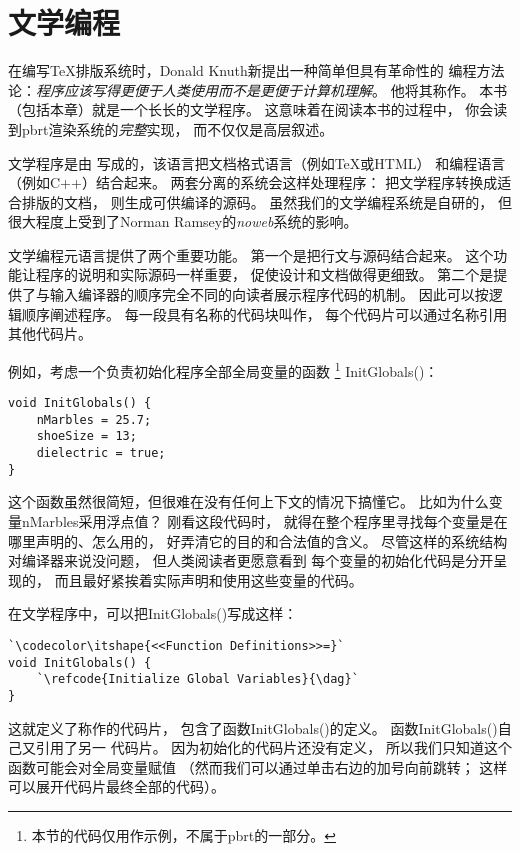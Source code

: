 \section{文学编程}\label{sec:文学编程}

在编写\TeX 排版系统时，Donald Knuth新提出一种简单但具有革命性的
编程方法论：\emph{程序应该写得更便于人类使用而不是更便于计算机理解}。
他将其称作。
本书（包括本章）就是一个长长的文学程序。
这意味着在阅读本书的过程中，
你会读到pbrt渲染系统的\emph{完整}实现，
而不仅仅是高层叙述。

文学程序是由
写成的，该语言把文档格式语言（例如\TeX 或HTML）
和编程语言（例如C++）结合起来。
两套分离的系统会这样处理程序：
把文学程序转换成适合排版的文档，
则生成可供编译的源码。
虽然我们的文学编程系统是自研的，
但很大程度上受到了Norman Ramsey的\emph{noweb}系统的影响。

文学编程元语言提供了两个重要功能。
第一个是把行文与源码结合起来。
这个功能让程序的说明和实际源码一样重要，
促使设计和文档做得更细致。
第二个是提供了与输入编译器的顺序完全不同的向读者展示程序代码的机制。
因此可以按逻辑顺序阐述程序。
每一段具有名称的代码块叫作，
每个代码片可以通过名称引用其他代码片。

例如，考虑一个负责初始化程序全部全局变量的函数
\footnote{本节的代码仅用作示例，不属于pbrt的一部分。}
{\ttfamily InitGlobals()}：
\begin{lstlisting}
void InitGlobals() {
    nMarbles = 25.7;
    shoeSize = 13;
    dielectric = true;
}
\end{lstlisting}

这个函数虽然很简短，但很难在没有任何上下文的情况下搞懂它。
比如为什么变量{\ttfamily nMarbles}采用浮点值？
刚看这段代码时，
就得在整个程序里寻找每个变量是在哪里声明的、怎么用的，
好弄清它的目的和合法值的含义。
尽管这样的系统结构对编译器来说没问题，
但人类阅读者更愿意看到
每个变量的初始化代码是分开呈现的，
而且最好紧挨着实际声明和使用这些变量的代码。

在文学程序中，可以把{\ttfamily InitGlobals()}写成这样：
\begin{lstlisting}
`\codecolor\itshape{<<Function Definitions>>=}`
void InitGlobals() {
    `\refcode{Initialize Global Variables}{\dag}`
}
\end{lstlisting}

这就定义了称作的代码片，
包含了函数{\ttfamily InitGlobals()}的定义。
函数{\ttfamily InitGlobals()}自己又引用了另一
代码片。
因为初始化的代码片还没有定义，
所以我们只知道这个函数可能会对全局变量赋值
（然而我们可以通过单击右边的加号向前跳转；
这样可以展开代码片最终全部的代码）。

